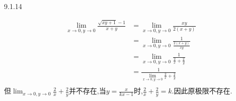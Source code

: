 \begin{exercise}{9.1.14}
\begin{enumerate}
\begin{solution}
            \begin{align*}
                \lim_{x\to0,y\to0}\frac{\sqrt{xy+1}-1}{x+y}
                &=\lim_{x\to0,y\to0}\frac{xy}{2(x+y)}\\
                &=\lim_{x\to0,y\to0}\frac{1}{\frac{2(x+y)}{xy}}\\
                &=\lim_{x\to0,y\to0}\frac{1}{\frac{2}{x}+\frac{2}{y}}
                \\
                &=\frac{1}{\lim_{x\to0,y\to0}{\frac{2}{x}+\frac{2}{y}}}
                \\
            \end{align*}
        但$\lim_{x\to0,y\to0}{\frac{2}{x}+\frac{2}{y}}$并不存在,当$y=\frac{x}{kx-1}$时,$\frac{2}{x}+\frac{2}{y}=k$.因此原极限不存在.
        \end{solution}
    \end{enumerate}
\end{exercise}

